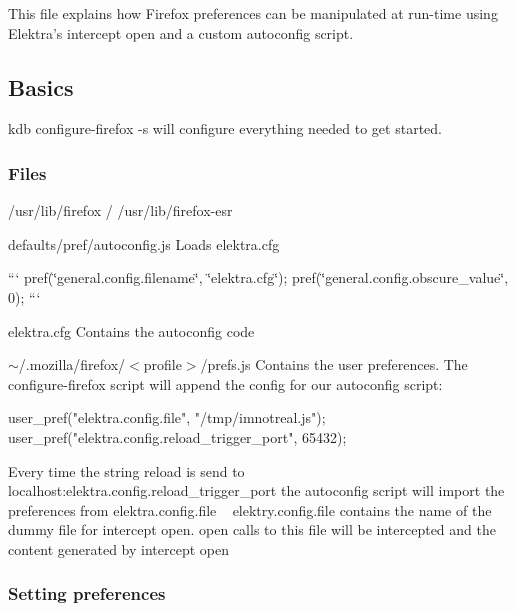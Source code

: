 This file explains how Firefox preferences can be manipulated at run-\/time using Elektra’s intercept open and a custom autoconfig script.

\subsection*{Basics}

{\ttfamily kdb configure-\/firefox -\/s} will configure everything needed to get started.

\subsubsection*{Files}


\begin{DoxyItemize}
\item {\ttfamily /usr/lib/firefox} / {\ttfamily /usr/lib/firefox-\/esr}
\begin{DoxyItemize}
\item {\ttfamily defaults/pref/autoconfig.\+js} Loads {\ttfamily elektra.\+cfg}

``` pref(\char`\"{}general.\+config.\+filename\char`\"{}, \char`\"{}elektra.\+cfg\char`\"{}); pref(\char`\"{}general.\+config.\+obscure\+\_\+value\char`\"{}, 0); ```
\item {\ttfamily elektra.\+cfg} Contains the autoconfig code
\end{DoxyItemize}
\item {\ttfamily $\sim$/.mozilla/firefox/$<$profile$>$/prefs.js} Contains the user preferences. The configure-\/firefox script will append the config for our autoconfig script\+:
\end{DoxyItemize}


\begin{DoxyCode}
user\_pref("elektra.config.file", "/tmp/imnotreal.js");
user\_pref("elektra.config.reload\_trigger\_port", 65432);
\end{DoxyCode}


Every time the string {\ttfamily reload} is send to localhost\+:{\ttfamily elektra.\+config.\+reload\+\_\+trigger\+\_\+port} the autoconfig script will import the preferences from {\ttfamily elektra.\+config.\+file} ~\newline
 {\ttfamily elektry.\+config.\+file} contains the name of the dummy file for {\ttfamily intercept open}. {\ttfamily open} calls to this file will be intercepted and the content generated by {\ttfamily intercept open}

\subsubsection*{Setting preferences}

